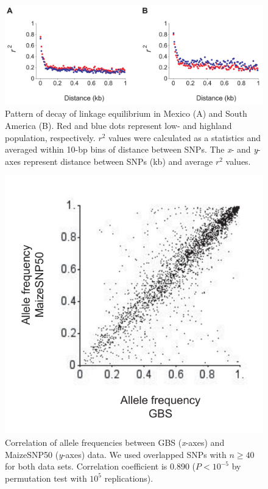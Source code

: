 \begin{figure}[t]
  \begin{center}
    \includegraphics[width=0.7\columnwidth]{fig/LD.pdf}
    \caption{Pattern of decay of linkage equilibrium in Mexico (A) and South America (B).  Red and blue dots represent low- and highland population, respectively.  $r^2$ values were calculated as a statistics and averaged within 10-bp bins of distance between SNPs.  The \emph{x}- and \emph{y}-axes represent distance between SNPs (kb) and average $r^2$ values.}
  \end{center}
\end{figure}


\begin{figure}[t]
  \begin{center}
    \includegraphics[width=0.4\columnwidth]{fig/col.pdf}
    \caption{Correlation of allele frequencies between GBS (\emph{x}-axes) and MaizeSNP50 (\emph{y}-axes) data.  We used overlapped SNPs with $n\geq40$ for both data sets.  Correlation coefficient is 0.890 ($P<10^{-5}$ by permutation test with $10^5$ replications).}
  \end{center}
\end{figure}








